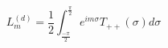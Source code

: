 \begin{equation}
L_{m}^{(d)}=\frac{1}{2}\int_{\frac{-\pi}{2}}^{\frac{\pi}{2}}e^{im\sigma}T_{++}(\sigma)d\sigma
\end{equation}

